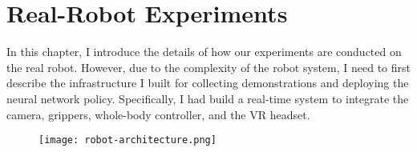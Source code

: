 \chapter{Real-Robot Experiments}

In this chapter, I introduce the details of how our experiments are conducted on the real robot. 
However, due to the complexity of the robot system, I need to first describe the infrastructure I built for collecting demonstrations and deploying the neural network policy. Specifically, I had build a real-time system to integrate the camera, grippers, whole-body controller, and the VR headset. 


\begin{figure}
	\centering
	\texttt{[image: robot-architecture.png]}
	\caption{}
    \label{fig:robot-architecture}
\end{figure}

